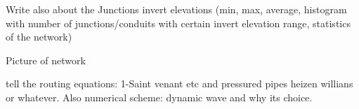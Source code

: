 

Write also about the Junctions invert elevations (min, max, average, histogram with number of junctions/conduits with certain invert elevation range, statistics of the network)

Picture of network


tell the routing equations: 1-Saint venant etc and pressured pipes heizen willians or whatever. 
Also numerical scheme: dynamic wave and why its choice.